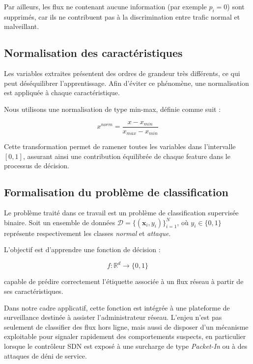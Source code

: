 \documentclass[11pt]{article}
\begin{document}
Par ailleurs, les flux ne contenant aucune information (par exemple $p_i = 0$) sont supprimés, car ils ne contribuent pas à la discrimination entre trafic normal et malveillant.

\subsection{Normalisation des caractéristiques}

Les variables extraites présentent des ordres de grandeur très différents, ce qui peut déséquilibrer l’apprentissage. Afin d’éviter ce phénomène, une normalisation est appliquée à chaque caractéristique.

Nous utilisons une normalisation de type min-max, définie comme suit :

\begin{equation}
x^{norm} = \frac{x - x_{min}}{x_{max} - x_{min}}
\end{equation}

Cette transformation permet de ramener toutes les variables dans l’intervalle $[0,1]$, assurant ainsi une contribution équilibrée de chaque feature dans le processus de décision.

\subsection{Formalisation du problème de classification}

Le problème traité dans ce travail est un problème de classification supervisée binaire. Soit un ensemble de données $\mathcal{D} = \{(\mathbf{x}_i, y_i)\}_{i=1}^N$, où $y_i \in \{0,1\}$ représente respectivement les classes \textit{normal} et \textit{attaque}.

L’objectif est d’apprendre une fonction de décision :

\begin{equation}
f : \mathbb{R}^d \rightarrow \{0,1\}
\end{equation}

capable de prédire correctement l’étiquette associée à un flux réseau à partir de ses caractéristiques.

Dans notre cadre applicatif, cette fonction est intégrée à une plateforme de surveillance destinée à assister l’administrateur réseau. L’enjeu n’est pas seulement de classifier des flux hors ligne, mais aussi de disposer d’un mécanisme exploitable pour signaler rapidement des comportements suspects, en particulier lorsque le contrôleur SDN est exposé à une surcharge de type \textit{Packet-In} ou à des attaques de déni de service.
\end{document}
